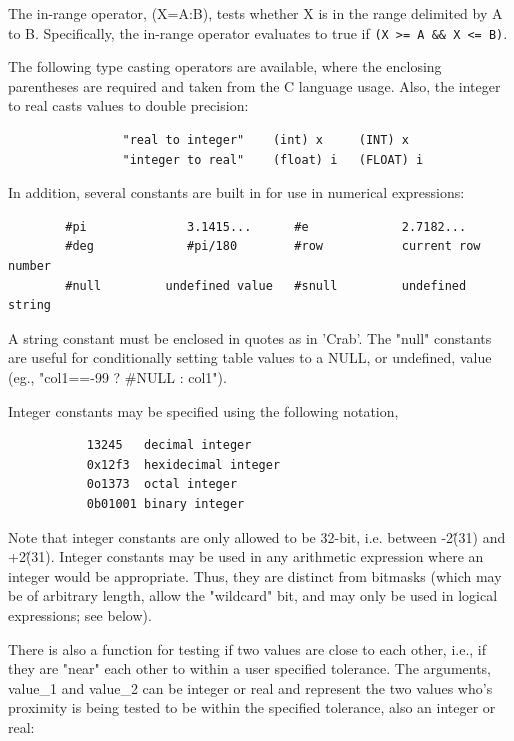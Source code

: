 \documentclass[11pt]{book}
\begin{document}
The in-range operator, (X=A:B), tests whether X is in the range
delimited by A to B.  Specifically, the in-range operator evaluates
to true if \verb+(X >= A && X <= B)+.

The following type casting operators are available, where the
enclosing parentheses are required and taken from the C language
usage. Also, the integer to real casts values to double precision:

\begin{verbatim}
                "real to integer"    (int) x     (INT) x
                "integer to real"    (float) i   (FLOAT) i
\end{verbatim}

    In addition, several constants are built in  for  use  in  numerical
    expressions:


\begin{verbatim}
        #pi              3.1415...      #e             2.7182...
        #deg             #pi/180        #row           current row number
        #null         undefined value   #snull         undefined string
\end{verbatim}

    A  string constant must  be enclosed  in quotes  as in  'Crab'.  The
    "null" constants  are useful for conditionally  setting table values
    to a NULL, or undefined, value (eg., "col1==-99 ? \#NULL : col1").

    Integer constants may be specified using the following notation,
\begin{verbatim}
           13245   decimal integer
           0x12f3  hexidecimal integer
           0o1373  octal integer
           0b01001 binary integer
\end{verbatim}
    Note that integer constants are only allowed to be 32-bit, i.e.
    between -2\^(31) and +2\^(31).  Integer constants may be used in any
    arithmetic expression where an integer would be appropriate.  Thus,
    they are distinct from bitmasks (which may be of arbitrary length,
    allow the "wildcard" bit, and may only be used in logical
    expressions; see below).

    There is also a function for testing if  two  values  are  close  to
    each  other,  i.e.,  if  they are "near" each other to within a user
    specified tolerance. The  arguments,  value\_1  and  value\_2  can  be
    integer  or  real  and  represent  the two values who's proximity is
    being tested to be within the specified tolerance, also  an  integer
    or real:
\end{document}
